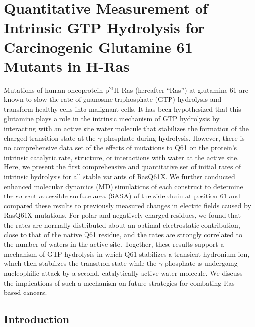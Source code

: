\chapter{Quantitative Measurement of Intrinsic GTP Hydrolysis for
Carcinogenic Glutamine 61 Mutants in H-Ras} \label{ras}

\newcommand{\RalBSCN}{{Ral$\beta$I18C$_{\text{SCN}}$}}
\newcommand{\RalB}{{Ral$\beta$}}


Mutations of human oncoprotein p$^{21}$H-Ras (hereafter ``Ras'') at glutamine 61 are known to slow the rate of guanosine triphosphate (GTP) hydrolysis and transform healthy cells into malignant cells. 
It has been hypothesized that this glutamine plays a role in the intrinsic mechanism of GTP hydrolysis by interacting with an active site water molecule that stabilizes the formation of the charged transition state at the $\gamma$-phosphate during hydrolysis.
However, there is no comprehensive data set of the effects of mutations to Q61 on the protein's intrinsic catalytic rate, structure, or interactions with water at the active site. 
Here, we present the first comprehensive and quantitative set of initial rates of intrinsic hydrolysis for all stable variants of RasQ61X. 
We further conducted enhanced molecular dynamics (MD) simulations of each construct to determine the solvent accessible surface area (SASA) of the side chain at position 61 and compared these results to previously measured changes in electric fields caused by RasQ61X mutations. 
For polar and negatively charged residues, we found that the rates are normally distributed about an optimal electrostatic contribution, close to that of the native Q61 residue, and the rates are strongly correlated to the number of waters in the active site. 
Together, these results support a mechanism of GTP hydrolysis in which Q61 stabilizes a transient hydronium ion, which then stabilizes the transition state while the $\gamma$-phosphate is undergoing nucleophilic attack by a second, catalytically active water molecule. 
We discuss the implications of such a mechanism on future strategies for combating Ras-based cancers.

\section{Introduction} \label{ras-intro}

